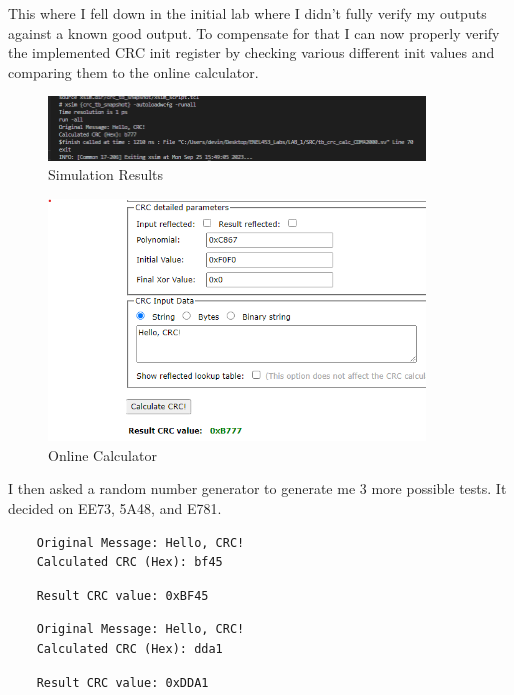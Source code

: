 This where I fell down in the initial lab where I didn't fully verify my outputs against a known good output. To compensate for that I can now properly verify the implemented CRC init register by checking various different init values and comparing them to the online calculator. 

\begin{figure}[H]
    \centering
    \includegraphics[width = 10cm]{Lab_1/Lab_1_Correction/Images/0F0F_verification.png}
    \caption{Simulation Results}
    \label{fig:simulationresult}
\end{figure}
\begin{figure}[H]
    \centering
    \includegraphics[width = 10cm]{Lab_1/Lab_1_Correction/Images/0F0F_verificationsite.png}
    \caption{Online Calculator}
    \label{fig:online_calc}
\end{figure}

I then asked a random number generator to generate me 3 more possible tests. It decided on EE73, 5A48, and E781. 

\begin{verbatim}
    Original Message: Hello, CRC!
    Calculated CRC (Hex): bf45
\end{verbatim}

\begin{verbatim}
    Result CRC value: 0xBF45
\end{verbatim}

\begin{verbatim}
    Original Message: Hello, CRC!
    Calculated CRC (Hex): dda1
\end{verbatim}

\begin{verbatim}
    Result CRC value: 0xDDA1
\end{verbatim}

